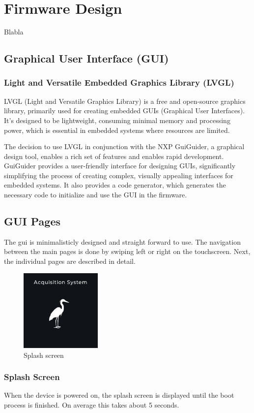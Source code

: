 \newpage
\section{Firmware Design}
Blabla

\subsection{Graphical User Interface (GUI)}

\subsubsection{Light and Versatile Embedded Graphics Library (LVGL)}
LVGL (Light and Versatile Graphics Library) is a free and open-source graphics library, primarily used for creating embedded GUIs (Graphical User Interfaces).
It's designed to be lightweight, consuming minimal memory and processing power, which is essential in embedded systems where resources are limited.

The decision to use LVGL in conjunction with the NXP GuiGuider, a graphical design tool, enables a rich set of features and enables rapid development.
GuiGuider provides a user-friendly interface for designing GUIs, significantly simplifying the process of creating complex, visually appealing interfaces for embedded systems.
It also provides a code generator, which generates the necessary code to initialize and use the GUI in the firmware.

\subsection{GUI Pages}
The \acrshort{gui} is minimalisticly designed and straight forward to use.
The navigation between the main pages is done by swiping left or right on the touchscreen.
Next, the individual pages are described in detail.

\begin{minipage}{\linewidth}
	\begin{figure}
		\vspace{-0.6cm}
		\includegraphics[width=4cm]{images/4_design_acquisition_system/gui/01_splash_screen.png}
		\centering
		\caption{Splash screen}
		\label{fig:acquisition_system_gui_splash_screen}
	\end{figure}
	\subsubsection{Splash Screen}
	When the device is powered on, the splash screen is displayed until the boot process is finished.
	On average this takes about 5 seconds.
\end{minipage}
\vspace{2.2cm}

